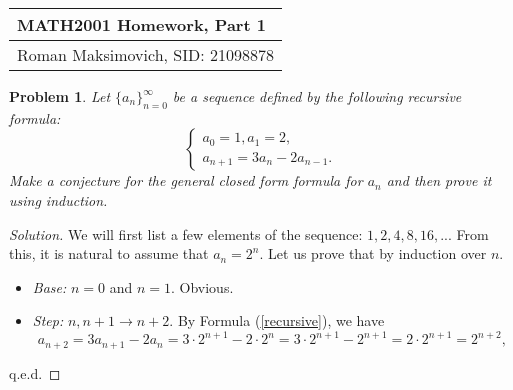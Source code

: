 \documentclass[a4paper, 12pt]{article}
\theoremstyle{plain}
\newtheorem{problem}{Problem}
\begin{document}
{
    \noindent
    \def\arraystretch{1.7}
    \setlength\arrayrulewidth{1.2pt}
    \begin{tabularx}{\textwidth}{|l}
        { \LARGE \bfseries MATH2001 Homework, Part 1 }\\
        \hline
        { \large Roman Maksimovich, SID: 21098878 }
    \end{tabularx}
}
\begin{problem}
    Let $ \{a_n\}_{n = 0}^{\infty} $ be a sequence defined by the following recursive formula:
    \begin{equation}
        \begin{cases}
            a_0 = 1, a_1 = 2,\\
            a_{n+1} = 3 a_n - 2 a_{n-1}.
        \end{cases}
        \label{recursive}
    \end{equation}
    Make a conjecture for the general closed form formula for $ a_n $ and then prove it using induction.
\end{problem}
\begin{proof}[Solution]
    We will first list a few elements of the sequence: $ 1, 2, 4, 8, 16, ... $ From this, it is natural to assume that $ a_n = 2^n $. Let us prove that by induction over $n$.
    \begin{itemize}
        \item \textit{Base:} $n = 0$ and $n = 1$. Obvious.
        \item \textit{Step:} $n, n+1 \to n+2$. By Formula (\ref{recursive}), we have
            \[
                a_{n+2} = 3 a_{n+1} - 2 a_{n} = 3 \cdot 2^{n+1} - 2 \cdot 2^n = 3 \cdot 2^{n+1} - 2^{n+1} = 2 \cdot 2^{n+1} = 2^{n+2},
            \]
    \end{itemize}
    q.e.d.
\end{proof}
\end{document}
